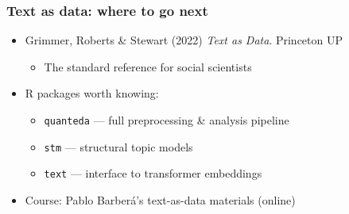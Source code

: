 \begin{frame}
\frametitle{Text as data: where to go next}
\centering

\begin{itemize}
\item Grimmer, Roberts \& Stewart (2022) \textit{Text as Data}. Princeton UP
  \begin{itemize}
  \item The standard reference for social scientists
  \end{itemize}
\vspace{6pt}
\item R packages worth knowing:
  \begin{itemize}
  \item \texttt{quanteda} --- full preprocessing \& analysis pipeline
  \item \texttt{stm} --- structural topic models
  \item \texttt{text} --- interface to transformer embeddings
  \end{itemize}
\vspace{6pt}
\item Course: Pablo Barber\'a's text-as-data materials (online)
\end{itemize}

\end{frame}
